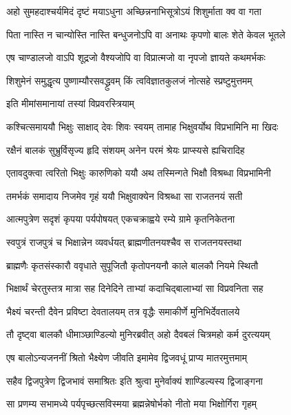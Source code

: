 \begin{center}
\twolineshloka
{अहो सुमहदाश्चर्यमिदं दृष्टं मयाऽधुना}
{अच्छिन्ननाभिसूत्रोऽयं शिशुर्माता क्व वा गता} %

\twolineshloka
{पिता नास्ति न चान्योस्ति नास्ति बन्धुजनोऽपि वा}
{अनाथः कृपणो बालः शेते केवल भूतले} %

\twolineshloka
{एष चाण्डालजो वाऽपि शूद्रजो वैश्यजोपि वा}
{विप्रात्मजो वा नृपजो ज्ञायते कथमर्भकः} %

\twolineshloka
{शिशुमेनं समुद्धृत्य पुष्णाम्यौरसवद्ध्रुवम्}
{किं त्वविज्ञातकुलजं नोत्सहे स्प्रष्टुमुत्तमम्} %

\onelineshloka
{इति मीमांसमानायां तस्यां विप्रवरस्त्रियाम्} %

\twolineshloka
{कश्चित्समाययौ भिक्षुः साक्षाद् देवः शिवः स्वयम्}
{तामाह भिक्षुवर्योथ विप्रभामिनि मा खिदः} %

\twolineshloka
{रक्षैनं बालकं सुभ्रुर्विसृज्य हृदि संशयम्}
{अनेन परमं श्रेयः प्राप्स्यसे ह्यचिरादिह} %

\twolineshloka
{एतावदुक्त्वा त्वरितो भिक्षुः कारुणिको ययौ}
{अथ तस्मिन्गते भिक्षौ विश्रब्धा विप्रभामिनी} %

\twolineshloka
{तमर्भकं समादाय निजमेव गृहं ययौ}
{भिक्षुवाक्येन विश्रब्धा सा राजतनयं सती} %

\twolineshloka
{आत्मपुत्रेण सदृशं कृपया पर्यपोषयत्}
{एकचक्राह्वये रम्ये ग्रामे कृतनिकेतना} %

\twolineshloka
{स्वपुत्रं राजपुत्रं च भिक्षान्नेन व्यवर्धयत्}
{ब्राह्मणीतनयश्चैव स राजतनयस्तथा} %

\twolineshloka
{ब्राह्मणैः कृतसंस्कारौ ववृधाते सुपूजितौ}
{कृतोपनयनौ काले बालकौ नियमे स्थितौ} %

\twolineshloka
{भिक्षार्थं चेरतुस्तत्र मात्रा सह दिनेदिने}
{ताभ्यां कदाचिद्बालाभ्यां सा विप्रवनिता सह} %

\twolineshloka
{भैक्ष्यं चरन्ती दैवेन प्रविष्टा देवतालयम्}
{तत्र वृद्धैः समाकीर्णे मुनिभिर्देवतालये} %

\twolineshloka
{तौ दृष्ट्वा बालकौ धीमाञ्छाण्डिल्यो मुनिरब्रवीत्}
{अहो दैवबलं चित्रमहो कर्म दुरत्ययम्} %

\twolineshloka
{एष बालोऽन्यजननीं श्रितो भैक्ष्येण जीवति}
{इमामेव द्विजवधूं प्राप्य मातरमुत्तमाम्} %

\twolineshloka
{सहैव द्विजपुत्रेण द्विजभावं समाश्रितः}
{इति श्रुत्वा मुनेर्वाक्यं शाण्डिल्यस्य द्विजाङ्गना} %

\twolineshloka
{सा प्रणम्य सभामध्ये पर्यपृच्छत्सविस्मया}
{ब्रह्मन्नेषोर्भको नीतो मया भिक्षोर्गिरा गृहम्} %


\end{center}
